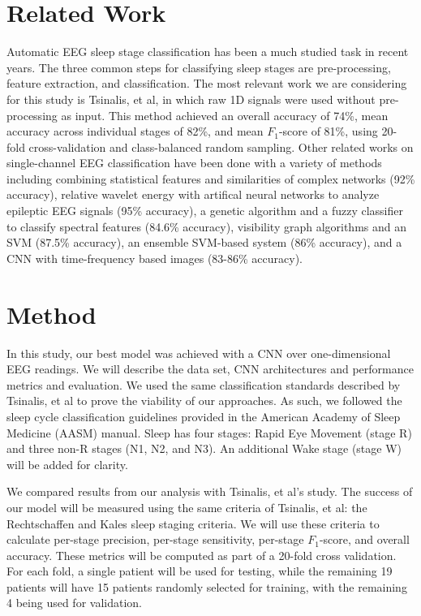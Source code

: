 \documentclass{amia}
\begin{document}
\section*{Related Work}
Automatic EEG sleep stage classification has been a much studied task in recent years. The three common steps for classifying sleep stages are pre-processing, feature extraction, and classification. The most relevant work we are considering for this study is Tsinalis, et al, in which raw 1D signals were used without pre-processing as input\cite{ref_Tsinalis2016}. This method achieved an overall accuracy of 74\%, mean accuracy across individual stages of 82\%, and mean $F_{1}$-score of 81\%, using 20-fold cross-validation and class-balanced random sampling. Other related works on single-channel EEG classification have been done with a variety of methods including combining statistical features and similarities of complex networks (92\% accuracy)\cite{ref_DiykhLi2016}, relative wavelet energy with artifical neural networks to analyze epileptic EEG signals (95\% accuracy)\cite{ref_Guo2009}, a genetic algorithm and a fuzzy classifier to classify spectral features (84.6\% accuracy)\cite{ref_Jo2010}, visibility graph algorithms and an SVM (87.5\% accuracy)\cite{ref_Liu2010}, an ensemble SVM-based system (86\% accuracy)\cite{ref_Koley2012}, and a CNN with time-frequency based images (83-86\% accuracy)\cite{ref_Vilamala2017}.

\section*{Method}
In this study, our best model was achieved with a CNN over one-dimensional EEG readings. We will describe the data set, CNN architectures and performance metrics and evaluation. We used the same classification standards described by Tsinalis, et al to prove the viability of our approaches. As such, we followed the sleep cycle classification guidelines provided in the American Academy of Sleep Medicine (AASM) manual\cite{ref_Iber2007}. Sleep has four stages: Rapid Eye Movement (stage R) and three non-R stages (N1, N2, and N3). An additional Wake stage (stage W) will be added for clarity.

We compared results from our analysis with Tsinalis, et al's study. The success of our model will be measured using the same criteria of Tsinalis, et al: the Rechtschaffen and Kales sleep staging criteria\cite{ref_Rechtschaffen1968}. We will use these criteria to calculate per-stage precision, per-stage sensitivity, per-stage $F_{1}$-score, and overall accuracy. These metrics will be computed as part of a 20-fold cross validation. For each fold, a single patient will be used for testing, while the remaining 19 patients will have 15 patients randomly selected for training, with the remaining 4 being used for validation.
\end{document}
